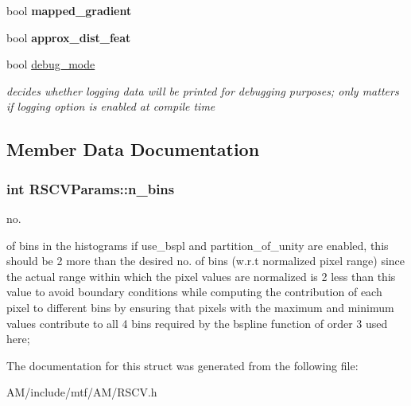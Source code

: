 \begin{DoxyCompactItemize}
\item 
\hypertarget{structRSCVParams_ad554b3fdaac5765c86763e0f29883345}{bool {\bfseries mapped\-\_\-gradient}}\label{structRSCVParams_ad554b3fdaac5765c86763e0f29883345}

\item 
\hypertarget{structRSCVParams_a08a90b514af594d7625dba82e7e0c0b7}{bool {\bfseries approx\-\_\-dist\-\_\-feat}}\label{structRSCVParams_a08a90b514af594d7625dba82e7e0c0b7}

\item 
\hypertarget{structRSCVParams_a5e275e5ebf1b7ebae6239b5c89894b31}{bool \hyperlink{structRSCVParams_a5e275e5ebf1b7ebae6239b5c89894b31}{debug\-\_\-mode}}\label{structRSCVParams_a5e275e5ebf1b7ebae6239b5c89894b31}

\begin{DoxyCompactList}\small\item\em decides whether logging data will be printed for debugging purposes; only matters if logging option is enabled at compile time \end{DoxyCompactList}\end{DoxyCompactItemize}


\subsection{Member Data Documentation}
\hypertarget{structRSCVParams_a8aaca4a91a8b7227e611d1706a8a7448}{
\subsubsection[{n\-\_\-bins}]{\setlength{\rightskip}{0pt plus 5cm}int R\-S\-C\-V\-Params\-::n\-\_\-bins}}\label{structRSCVParams_a8aaca4a91a8b7227e611d1706a8a7448}


no. 

of bins in the histograms if use\-\_\-bspl and partition\-\_\-of\-\_\-unity are enabled, this should be 2 more than the desired no. of bins (w.\-r.\-t normalized pixel range) since the actual range within which the pixel values are normalized is 2 less than this value to avoid boundary conditions while computing the contribution of each pixel to different bins by ensuring that pixels with the maximum and minimum values contribute to all 4 bins required by the bspline function of order 3 used here; 

The documentation for this struct was generated from the following file\-:\begin{DoxyCompactItemize}
\item 
A\-M/include/mtf/\-A\-M/R\-S\-C\-V.\-h\end{DoxyCompactItemize}
